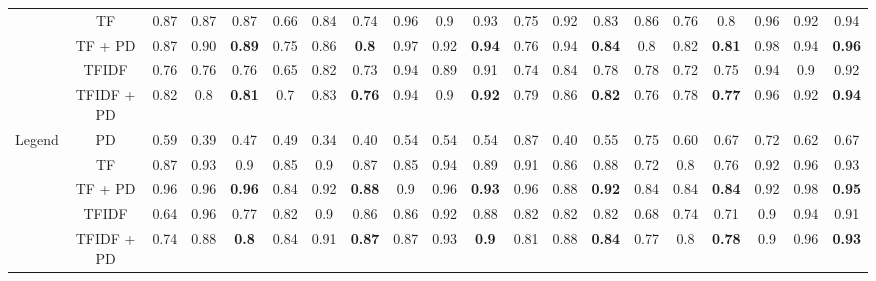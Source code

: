 \documentclass{beamer}
\begin{document}
\begin{frame}
\begin{table}[h]
{\begin{tabular}{|c|c|c|c|c|c|c|c|c|c|c||c|c|c|c|c|c|c|c|c|}
 & TF & 0.87 & 0.87 & 0.87 & 0.66 & 0.84 & 0.74 & 0.96 & 0.9 & 0.93 & 0.75 & 0.92 & 0.83 & 0.86 & 0.76 & 0.8 & 0.96 & 0.92 & 0.94 \\ \cline{2-20} 
 & TF + PD & 0.87 & 0.90 & {\color{blue} \textbf{0.89}} & 0.75 & 0.86 & {\color{blue} \textbf{0.8}} & 0.97 & 0.92 & {\color{blue} \textbf{0.94}} & 0.76 & 0.94 & {\color{blue} \textbf{0.84}} & 0.8 & 0.82 & {\color{blue} \textbf{0.81}} & 0.98 & 0.94 & {\color{blue} \textbf{0.96}} \\ \cline{2-20}
 & TFIDF & 0.76 & 0.76 & 0.76 & 0.65 & 0.82 & 0.73 & 0.94 & 0.89 & 0.91 & 0.74 & 0.84 & 0.78 & 0.78 & 0.72 & 0.75 & 0.94 & 0.9 & 0.92 \\ \cline{2-20} 
 & TFIDF + PD & 0.82 & 0.8 & {\color{blue} \textbf{0.81}} & 0.7 & 0.83 & {\color{blue} \textbf{0.76}} & 0.94 & 0.9 & {\color{blue} \textbf{0.92}} & 0.79 & 0.86 & {\color{blue} \textbf{0.82}} & 0.76 & 0.78 & {\color{blue} \textbf{0.77}} & 0.96 & 0.92 & {\color{blue} \textbf{0.94}} \\ \hline
\multirow{5}{*}{Legend} & PD & 0.59 & 0.39 & 0.47 & 0.49 & 0.34 & 0.40 & 0.54 & 0.54 & 0.54 & 0.87 & 0.40 & 0.55 & 0.75 & 0.60 & 0.67 & 0.72 & 0.62 & 0.67 \\ \cline{2-20} 
 & TF & 0.87 & 0.93 & 0.9 & 0.85 & 0.9 & 0.87 & 0.85 & 0.94 & 0.89 & 0.91 & 0.86 & 0.88 & 0.72 & 0.8 & 0.76 & 0.92 & 0.96 & 0.93 \\ \cline{2-20} 
 & TF + PD & 0.96 & 0.96 & {\color{blue} \textbf{0.96}} & 0.84 & 0.92 & {\color{blue} \textbf{0.88}} & 0.9 & 0.96 & {\color{blue} \textbf{0.93}} & 0.96 & 0.88 & {\color{blue} \textbf{0.92}} & 0.84 & 0.84 & {\color{blue} \textbf{0.84}} & 0.92 & 0.98 & {\color{blue} \textbf{0.95}} \\ \cline{2-20} 
 & TFIDF & 0.64 & 0.96 & 0.77 & 0.82 & 0.9 & 0.86 & 0.86 & 0.92 & 0.88 & 0.82 & 0.82 & 0.82 & 0.68 & 0.74 & 0.71 & 0.9 & 0.94 & 0.91 \\ \cline{2-20} 
 & TFIDF + PD & 0.74 & 0.88 & {\color{blue} \textbf{0.8}} & 0.84 & 0.91 & {\color{blue} \textbf{0.87}} & 0.87 & 0.93 & {\color{blue} \textbf{0.9}} & 0.81 & 0.88 & {\color{blue} \textbf{0.84}} & 0.77 & 0.8 & {\color{blue} \textbf{0.78}} & 0.9 & 0.96 & {\color{blue} \textbf{0.93}} \\ \hline
 \end{tabular}}
\end{table}


\end{frame}
\end{document}
